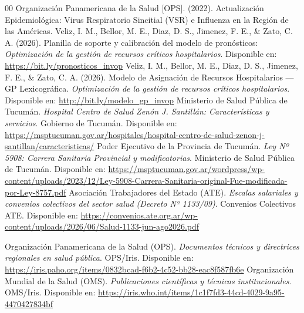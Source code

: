 \documentclass[conference]{IEEEtran}
\begin{document}
\begin{thebibliography}{00}
     Organización Panamericana de la Salud [OPS]. (2022). Actualización Epidemiológica: Virus Respiratorio Sincitial (VSR) e Influenza en la Región de las Américas.
     Veliz, I. M., Bellor, M. E., Diaz, D. S., Jimenez, F. E., \& Zato, C. A. (2026). Planilla de soporte y calibración del modelo de pronósticos: \emph{Optimización de la gestión de recursos críticos hospitalarios}. Disponible en: \url{https://bit.ly/pronosticos_invop}
     Veliz, I. M., Bellor, M. E., Diaz, D. S., Jimenez, F. E., \& Zato, C. A. (2026). Modelo de Asignación de Recursos Hospitalarios — GP Lexicográfica. \emph{Optimización de la gestión de recursos críticos hospitalarios}. Disponible en: \url{http://bit.ly/modelo_gp_invop}
     Ministerio de Salud Pública de Tucumán. \emph{Hospital Centro de Salud Zenón J. Santillán: Características y servicios}. Gobierno de Tucumán. Disponible en: \url{https://msptucuman.gov.ar/hospitales/hospital-centro-de-salud-zenon-j-santillan/caracteristicas/}
     Poder Ejecutivo de la Provincia de Tucumán. \emph{Ley Nº 5908: Carrera Sanitaria Provincial y modificatorias}. Ministerio de Salud Pública de Tucumán. Disponible en: \url{https://msptucuman.gov.ar/wordpress/wp-content/uploads/2023/12/Ley-5908-Carrera-Sanitaria-original-Fue-modificada-por-Ley-8757.pdf}
     Asociación Trabajadores del Estado (ATE). \emph{Escalas salariales y convenios colectivos del sector salud (Decreto Nº 1133/09)}. Convenios Colectivos ATE. Disponible en: \url{https://convenios.ate.org.ar/wp-content/uploads/2026/06/Salud-1133-jun-ago2026.pdf}

     Organización Panamericana de la Salud (OPS). \emph{Documentos técnicos y directrices regionales en salud pública}. OPS/Iris. Disponible en: \url{https://iris.paho.org/items/0832bcad-f6b2-4c52-bb28-eac8f587fb6e}
     Organización Mundial de la Salud (OMS). \emph{Publicaciones científicas y técnicas institucionales}. OMS/Iris. Disponible en: \url{https://iris.who.int/items/1c1f7fd3-44cd-4029-9a95-4470427834bf}
\end{thebibliography}
\end{document}
